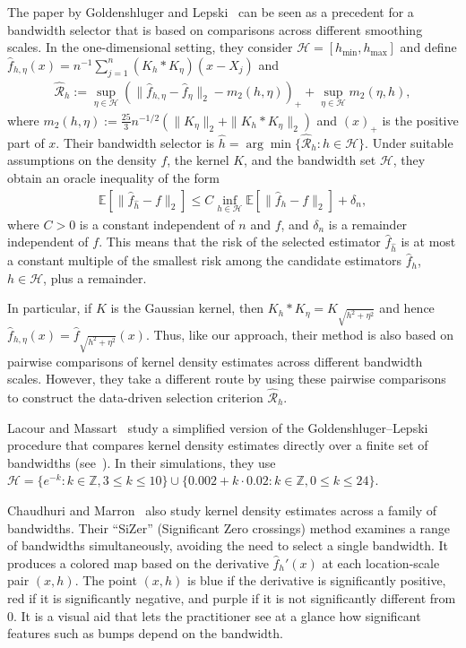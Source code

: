 The paper by Goldenshluger and Lepski~\cite{goldenshluger_bandwidth_2011} can be seen as a precedent for a bandwidth selector that is based on comparisons across different smoothing scales. In the one-dimensional setting, they consider $\mathcal{H}=[h_{\min},h_{\max}]$ and define $\hat{f}_{h,\eta}(x)=n^{-1}\sum_{j=1}^{n}(K_h\ast K_{\eta})(x-X_j)$ and
\begin{align*}
    \hat{\mathcal{R}}_h:=\sup_{\eta\in\mathcal{H}}\left(\|\hat{f}_{h,\eta}-\hat{f}_{\eta}\|_2-m_2(h,\eta)\right)_++\sup_{\eta\in\mathcal{H}}m_2(\eta,h),
\end{align*}
where $m_2(h,\eta):=\frac{25}{3}n^{-1/2}\left(\|K_{\eta}\|_2+\|K_h\ast K_{\eta}\|_2\right)$ and $(x)_+$ is the positive part of $x$. Their bandwidth selector is $\hat{h}=\arg\min\{\hat{\mathcal{R}}_h:h\in\mathcal{H}\}$. Under suitable assumptions on the density $f$, the kernel $K$, and the bandwidth set $\mathcal{H}$, they obtain an oracle inequality of the form
\begin{align*}
    \mathbb{E}[\|\hat{f}_{\hat{h}}-f\|_2]\le C\inf_{h\in\mathcal{H}}\mathbb{E}[\|\hat{f}_h-f\|_2]+\delta_n,
\end{align*}
where $C>0$ is a constant independent of $n$ and $f$, and $\delta_n$ is a remainder independent of $f$. This means that the risk of the selected estimator $\hat{f}_{\hat{h}}$ is at most a constant multiple of the smallest risk among the candidate estimators $\hat{f}_h$, $h\in\mathcal{H}$, plus a remainder.

In particular, if $K$ is the Gaussian kernel, then $K_h\ast K_{\eta}=K_{\sqrt{h^2+\eta^2}}$ and hence $\hat{f}_{h,\eta}(x)=\hat{f}_{\sqrt{h^2+\eta^2}}(x)$. Thus, like our approach, their method is also based on pairwise comparisons of kernel density estimates across different bandwidth scales. However, they take a different route by using these pairwise comparisons to construct the data-driven selection criterion $\mathcal{\hat{R}}_h$.


Lacour and Massart~\cite{lacour_minimal_2016} study a simplified version of the Goldenshluger--Lepski procedure that compares kernel density estimates directly over a finite set of bandwidths (see~\cite[Equation~(2)]{lacour_minimal_2016}). In their simulations, they use $\mathcal{H}=\{e^{-k}:k\in\mathbb{Z},3\le k\le 10\}\cup\{0.002+k\cdot0.02:k\in\mathbb{Z},0\le k\le 24\}$.


Chaudhuri and Marron~\cite{chaudhuri_sizer_nodate} also study kernel density estimates across a family of bandwidths. Their \enquote{SiZer} (Significant Zero crossings) method examines a range of bandwidths simultaneously, avoiding the need to select a single bandwidth. It produces a colored map based on the derivative $\hat{f}_h'(x)$ at each location-scale pair $(x,h)$. The point $(x,h)$ is blue if the derivative is significantly positive, red if it is significantly negative, and purple if it is not significantly different from $0$. It is a visual aid that lets the practitioner see at a glance how significant features such as bumps depend on the bandwidth.


